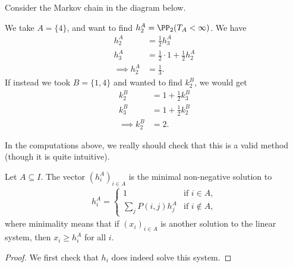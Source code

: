 \documentclass[a4paper]{scrartcl}
\begin{document}
\begin{example}
	Consider the Markov chain in the diagram below.
	\begin{center}
		\end{center}

		We take $A = \{4\}$, and want to find $h_2^A = \PP_2(T_A < \infty)$. We have
		\begin{align*}
			h_2^A &= \frac{1}{2}h_3^A \\
			h_3^A &= \frac{1}{2} \cdot 1 + \frac{1}{2} h_2^A \\
		\implies h_2^A &= \frac{1}{3}.
		\end{align*}
		If instead we took $B = \{1, 4\}$ and wanted to find $k_2^B$, we would get
		\begin{align*}
			k_2^B &= 1 + \frac{1}{2}k_3^B \\
			k_3^B &= 1 + \frac{1}{2}k_2^B \\
	\implies k_2^B &= 2.
		\end{align*}
\end{example}

In the computations above, we really should check that this is a valid method (though it is quite intuitive).

\begin{theorem}
	Let $A \subseteq I$. The vector $(h_i^A)_{i \in A}$ is the minimal non-negative solution to
	\begin{align*}
		h_i^A = \begin{cases}
			1 &\mbox{if } i  \in A, \\
			\sum_{j} P(i, j) h_j^A &\mbox{if } i \not \in A,
		   \end{cases}
	\end{align*}
	where minimality means that if $(x_i)_{i \in A}$ is another solution to the linear system, then $x_i \geq h_i^A$ for all $i$.
\end{theorem}
\begin{proof}
	We first check that $h_i$ does indeed solve this system. 
\end{proof}
\end{document}
